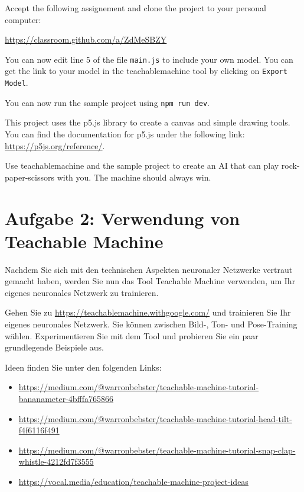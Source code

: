 \documentclass[12pt,a4paper]{report}
\begin{document}
\begin{ex}
      Accept the following assignement and clone the project to your personal computer:
      
      \url{https://classroom.github.com/a/ZdMeSBZY}

      You can now edit line 5 of the file \verb|main.js| to include your own model. You can get the link to your model in the teachablemachine tool by clicking on \verb|Export Model|.

     You can now run the sample project using \verb|npm run dev|.

     This project uses the p5.js library to create a canvas and simple drawing tools. You can find the documentation for p5.js under the following link: \url{https://p5js.org/reference/}.
\end{ex}

\begin{ex}
      Use teachablemachine and the sample project to create an AI that can play rock-paper-scissors with you. The machine should always win.
\end{ex}

\newpage

\section*{Aufgabe 2: Verwendung von Teachable Machine}
Nachdem Sie sich mit den technischen Aspekten neuronaler Netzwerke vertraut gemacht haben, werden Sie nun das Tool Teachable Machine verwenden, um Ihr eigenes neuronales Netzwerk zu trainieren.

\begin{ex}
    Gehen Sie zu \url{https://teachablemachine.withgoogle.com/} und trainieren Sie Ihr eigenes neuronales Netzwerk. Sie können zwischen Bild-, Ton- und Pose-Training wählen. Experimentieren Sie mit dem Tool und probieren Sie ein paar grundlegende Beispiele aus.

    Ideen finden Sie unter den folgenden Links:
    \begin{itemize}
        \item \url{https://medium.com/@warronbebster/teachable-machine-tutorial-bananameter-4bfffa765866}
        \item \url{https://medium.com/@warronbebster/teachable-machine-tutorial-head-tilt-f4f6116f491}
        \item \url{https://medium.com/@warronbebster/teachable-machine-tutorial-snap-clap-whistle-4212fd7f3555}
        \item \url{https://vocal.media/education/teachable-machine-project-ideas}
    \end{itemize}
\end{ex}
\end{document}
